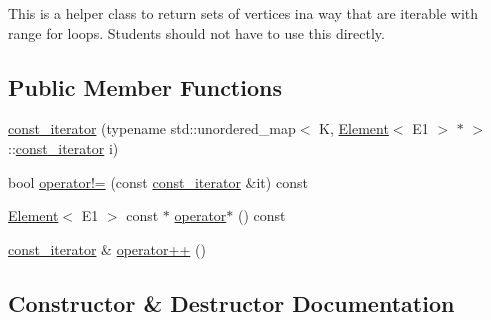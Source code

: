 This is a helper class to return sets of vertices ina way that are iterable with range for loops. Students should not have to use this directly. \subsection*{Public Member Functions}
\begin{DoxyCompactItemize}
\item 
\mbox{\hyperlink{classbridges_1_1datastructure_1_1_graph_adj_list_1_1const_vertex_element_set__listhelper_1_1const__iterator_a4b7fc58222ec911d26672daa5e255a1d}{const\+\_\+iterator}} (typename std\+::unordered\+\_\+map$<$ K, \mbox{\hyperlink{classbridges_1_1datastructure_1_1_element}{Element}}$<$ E1 $>$ $\ast$ $>$\+::\mbox{\hyperlink{classbridges_1_1datastructure_1_1_graph_adj_list_1_1const_vertex_element_set__listhelper_1_1const__iterator}{const\+\_\+iterator}} i)
\item 
bool \mbox{\hyperlink{classbridges_1_1datastructure_1_1_graph_adj_list_1_1const_vertex_element_set__listhelper_1_1const__iterator_ac30d7d7e8eb8a976f7dd193bc7cb7b1c}{operator!=}} (const \mbox{\hyperlink{classbridges_1_1datastructure_1_1_graph_adj_list_1_1const_vertex_element_set__listhelper_1_1const__iterator}{const\+\_\+iterator}} \&it) const
\item 
\mbox{\hyperlink{classbridges_1_1datastructure_1_1_element}{Element}}$<$ E1 $>$ const  $\ast$ \mbox{\hyperlink{classbridges_1_1datastructure_1_1_graph_adj_list_1_1const_vertex_element_set__listhelper_1_1const__iterator_ae6e06df1132d7d1646385388d28bc8b0}{operator$\ast$}} () const
\item 
\mbox{\hyperlink{classbridges_1_1datastructure_1_1_graph_adj_list_1_1const_vertex_element_set__listhelper_1_1const__iterator}{const\+\_\+iterator}} \& \mbox{\hyperlink{classbridges_1_1datastructure_1_1_graph_adj_list_1_1const_vertex_element_set__listhelper_1_1const__iterator_ad778b5c8406c308e1b80700882171243}{operator++}} ()
\end{DoxyCompactItemize}


\subsection{Constructor \& Destructor Documentation}
\mbox{\label{classbridges_1_1datastructure_1_1_graph_adj_list_1_1const_vertex_element_set__listhelper_1_1const__iterator_a4b7fc58222ec911d26672daa5e255a1d}} 

